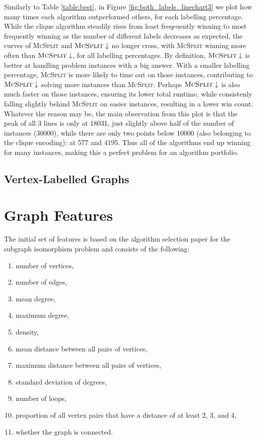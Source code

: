\documentclass{l4proj}
\theoremstyle{definition}
\theoremstyle{remark}
\begin{document}
Similarly to Table \ref{table:best}, in Figure \ref{fig:both_labels_linechart3}
we plot how many times each algorithm outperformed others, for each labelling
percentage. While the clique algorithm steadily rises from least freqeuently
winning to most frequently winning as the number of different labels decreases
as expected, the curves of \textsc{McSplit} and $\textsc{McSplit}\downarrow$ no
longer cross, with \textsc{McSplit} winning more often than
$\textsc{McSplit}\downarrow$, for all labelling percentages. By definition,
$\textsc{McSplit}\downarrow$ is better at handling problem instances with a big
answer. With a smaller labelling percentage, \textsc{McSplit} is more likely to
time out on those instances, contributing to $\textsc{McSplit}\downarrow$
solving more instances than \textsc{McSplit}. Perhaps
$\textsc{McSplit}\downarrow$ is also much faster on those instances, ensuring
its lower total runtime, while consistenly falling slightly behind
\textsc{McSplit} on easier instances, resulting in a lower win count. Whatever
the reason may be, the main observation from this plot is that the peak of all 3
lines is only at \num{18031}, just slightly above half of the number of
instances (\num{30000}), while there are only two points below \num{10000} (also
belonging to the clique encoding): at 577 and 4195. Thus all of the algorithms
end up winning for many instances, making this a perfect problem for an
algorithm portfolio.

\subsection{Vertex-Labelled Graphs} \label{sec:runtime_vertex}

\section{Graph Features} \label{sec:features}
The initial set of features is based on the algorithm selection paper for the
subgraph isomorphism problem \cite{DBLP:conf/lion/KotthoffMS16} and consists of
the following:

\begin{enumerate}
\item number of vertices,
\item number of edges,
\item mean degree,
\item maximum degree,
\item density,
\item mean distance between all pairs of vertices,
\item maximum distance between all pairs of vertices,
\item standard deviation of degrees,
\item number of loops,
\item proportion of all vertex pairs that have a distance of at least 2, 3, and 4,
\item whether the graph is connected.
\end{enumerate}
\end{document}
